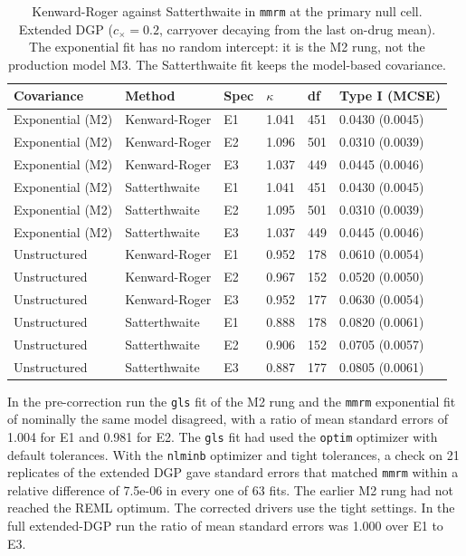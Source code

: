 \documentclass[
  11pt,
]{article}
\begin{document}
\begin{longtable}[t]{llllll}
\caption{\label{tab:tab-kr}Kenward-Roger against Satterthwaite in \texttt{mmrm} at the primary null cell. Extended DGP ($c_\times = 0.2$, carryover decaying from the last on-drug mean). The exponential fit has no random intercept: it is the M2 rung, not the production model M3. The Satterthwaite fit keeps the model-based covariance.}\\
\toprule
Covariance & Method & Spec & $\kappa$ & df & Type I (MCSE)\\
\midrule
Exponential (M2) & Kenward-Roger & E1 & 1.041 & 451 & 0.0430 (0.0045)\\
Exponential (M2) & Kenward-Roger & E2 & 1.096 & 501 & 0.0310 (0.0039)\\
Exponential (M2) & Kenward-Roger & E3 & 1.037 & 449 & 0.0445 (0.0046)\\
Exponential (M2) & Satterthwaite & E1 & 1.041 & 451 & 0.0430 (0.0045)\\
Exponential (M2) & Satterthwaite & E2 & 1.095 & 501 & 0.0310 (0.0039)\\
\addlinespace
Exponential (M2) & Satterthwaite & E3 & 1.037 & 449 & 0.0445 (0.0046)\\
Unstructured & Kenward-Roger & E1 & 0.952 & 178 & 0.0610 (0.0054)\\
Unstructured & Kenward-Roger & E2 & 0.967 & 152 & 0.0520 (0.0050)\\
Unstructured & Kenward-Roger & E3 & 0.952 & 177 & 0.0630 (0.0054)\\
Unstructured & Satterthwaite & E1 & 0.888 & 178 & 0.0820 (0.0061)\\
\addlinespace
Unstructured & Satterthwaite & E2 & 0.906 & 152 & 0.0705 (0.0057)\\
Unstructured & Satterthwaite & E3 & 0.887 & 177 & 0.0805 (0.0061)\\
\bottomrule
\end{longtable}

In the pre-correction run the \texttt{gls} fit of the M2 rung and the \texttt{mmrm}
exponential fit of nominally the same model disagreed, with a ratio of
mean standard errors of 1.004 for E1 and
0.981 for E2. The \texttt{gls} fit had used the \texttt{optim}
optimizer with default tolerances. With the \texttt{nlminb} optimizer and
tight tolerances, a check on 21 replicates of the extended DGP gave
standard errors that matched \texttt{mmrm} within a relative difference of
7.5e-06 in every one of
63 fits. The earlier M2 rung had not reached the REML
optimum. The corrected drivers use the tight settings.
In the full extended-DGP run the ratio of mean standard errors was 1.000 over E1 to E3.
\end{document}
